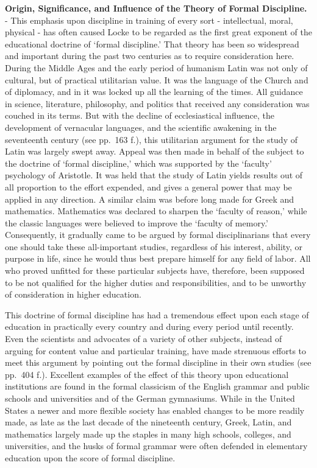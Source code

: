 \documentclass[]{book}
\begin{document}
\textbf{Origin, Significance, and Influence of the Theory of Formal Discipline.} - This emphasis upon discipline in training of every sort - intellectual, moral, physical - has often caused Locke to be regarded as the first great exponent of the educational doctrine of `formal discipline.' That theory has been so widespread and important during the past two centuries as to require consideration here. During the Middle Ages and the early period of humanism Latin was not only of cultural, but of practical utilitarian value. It was the language of the Church and of diplomacy, and in it was locked up all the learning of the times. All guidance in science, literature, philosophy, and politics that received any consideration was couched in its terms. But with the decline of ecclesiastical influence, the development of vernacular languages, and the scientific awakening in the seventeenth century (see pp.~163 f.), this utilitarian argument for the study of Latin was largely swept away. Appeal was then made in behalf of the subject to the doctrine of `formal discipline,' which was supported by the `faculty' psychology of Aristotle. It was held that the study of Latin yields results out of all proportion to the effort expended, and gives a general power that may be applied in any direction. A similar claim was before long made for Greek and mathematics. Mathematics was declared to sharpen the `faculty of reason,' while the classic languages were believed to improve the `faculty of memory.' Consequently, it gradually came to be argued by formal disciplinarians that every one should take these all-important studies, regardless of his interest, ability, or purpose in life, since he would thus best prepare himself for any field of labor. All who proved unfitted for these particular subjects have, therefore, been supposed to be not qualified for the higher duties and responsibilities, and to be unworthy of consideration in higher education.

This doctrine of formal discipline has had a tremendous effect upon each stage of education in practically every country and during every period until recently. Even the scientists and advocates of a variety of other subjects, instead of arguing for content value and particular training, have made strenuous efforts to meet this argument by pointing out the formal discipline in their own studies (see pp.~404 f.). Excellent examples of the effect of this theory upon educational institutions are found in the formal classicism of the English grammar and public schools and universities and of the German gymnasiums. While in the United States a newer and more flexible society has enabled changes to be more readily made, as late as the last decade of the nineteenth century, Greek, Latin, and mathematics largely made up the staples in many high schools, colleges, and universities, and the husks of formal grammar were often defended in elementary education upon the score of formal discipline.
\end{document}
